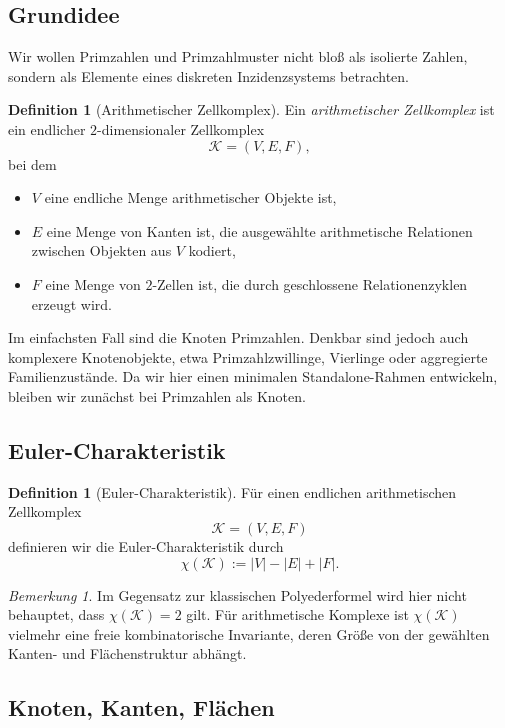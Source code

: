 \documentclass[11pt,a4paper]{article}
\theoremstyle{definition}
\newtheorem{definition}[theorem]{Definition}
\theoremstyle{remark}
\newtheorem{remark}[theorem]{Bemerkung}
\begin{document}
	\subsection{Grundidee}
	
	Wir wollen Primzahlen und Primzahlmuster nicht bloß als isolierte Zahlen, sondern als Elemente eines diskreten Inzidenzsystems betrachten.
	
	\begin{definition}[Arithmetischer Zellkomplex]
		Ein \emph{arithmetischer Zellkomplex} ist ein endlicher $2$-dimensionaler Zellkomplex
		\[
		\mathcal K=(V,E,F),
		\]
		bei dem
		\begin{itemize}[itemsep=0.2em]
			\item $V$ eine endliche Menge arithmetischer Objekte ist,
			\item $E$ eine Menge von Kanten ist, die ausgewählte arithmetische Relationen zwischen Objekten aus $V$ kodiert,
			\item $F$ eine Menge von $2$-Zellen ist, die durch geschlossene Relationenzyklen erzeugt wird.
		\end{itemize}
	\end{definition}
	
	Im einfachsten Fall sind die Knoten Primzahlen. Denkbar sind jedoch auch komplexere Knotenobjekte, etwa Primzahlzwillinge, Vierlinge oder aggregierte Familienzustände. Da wir hier einen minimalen Standalone-Rahmen entwickeln, bleiben wir zunächst bei Primzahlen als Knoten.
	
	\subsection{Euler-Charakteristik}
	
	\begin{definition}[Euler-Charakteristik]
		Für einen endlichen arithmetischen Zellkomplex
		\[
		\mathcal K=(V,E,F)
		\]
		definieren wir die Euler-Charakteristik durch
		\[
		\chi(\mathcal K):=|V|-|E|+|F|.
		\]
	\end{definition}
	
	\begin{remark}
		Im Gegensatz zur klassischen Polyederformel wird hier nicht behauptet, dass $\chi(\mathcal K)=2$ gilt. Für arithmetische Komplexe ist $\chi(\mathcal K)$ vielmehr eine freie kombinatorische Invariante, deren Größe von der gewählten Kanten- und Flächenstruktur abhängt.
	\end{remark}
	
	\subsection{Knoten, Kanten, Flächen}
	
\end{document}
